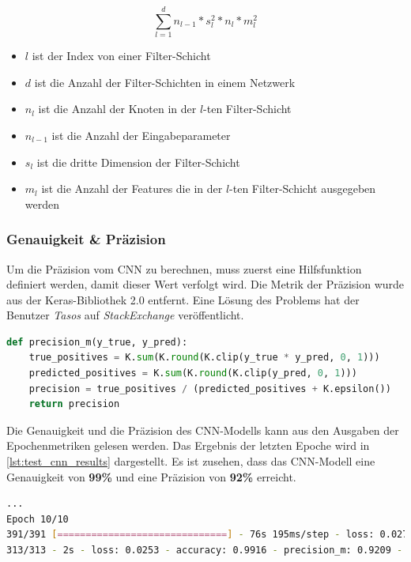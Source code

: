 \[\sum^{d}_{l=1}n_{l-1} * s^2_l * n_l * m^2_l \]

\begin{itemize}
    \item $l$ ist der Index von einer Filter-Schicht
    \item $d$ ist die Anzahl der Filter-Schichten in einem Netzwerk
    \item $n_l$ ist die Anzahl der Knoten in der $l$-ten Filter-Schicht
    \item $n_{l-1}$ ist die Anzahl der Eingabeparameter
    \item $s_l$ ist die dritte Dimension der Filter-Schicht
    \item $m_l$ ist die Anzahl der Features die in der $l$-ten Filter-Schicht ausgegeben werden
\end{itemize}
\cite{Kaiming_2014}

\subsubsection{Genauigkeit \& Präzision}

Um die Präzision vom CNN zu berechnen, muss zuerst eine Hilfsfunktion definiert werden, damit dieser Wert verfolgt wird. Die Metrik der Präzision wurde aus der Keras-Bibliothek 2.0 entfernt. Eine Lösung des Problems hat der Benutzer \textit{Tasos} auf \textit{StackExchange} veröffentlicht. \cite{stackexchange_2020}

\begin{minipage}{\textwidth}
    \begin{lstlisting}[language=Python, caption=Hilfsfunktion für Präzision \cite{stackexchange_2020}, label=lst:func_precision]
def precision_m(y_true, y_pred):
	true_positives = K.sum(K.round(K.clip(y_true * y_pred, 0, 1)))
	predicted_positives = K.sum(K.round(K.clip(y_pred, 0, 1)))
	precision = true_positives / (predicted_positives + K.epsilon())
	return precision	
	\end{lstlisting}
\end{minipage}


Die Genauigkeit und die Präzision des CNN-Modells kann aus den Ausgaben der Epochenmetriken gelesen werden. Das Ergebnis der letzten Epoche wird in \ref{lst:test_cnn_results} dargestellt. Es ist zusehen, dass das CNN-Modell eine Genauigkeit von \textbf{99\%} und eine Präzision von \textbf{92\%} erreicht.

\begin{minipage}{\textwidth}
    \begin{lstlisting}[language=Bash, caption=Testergebnisse vom CNN, label=lst:test_cnn_results]
...
Epoch 10/10
391/391 [==============================] - 76s 195ms/step - loss: 0.0273 - accuracy: 0.9909 - precision_m: 0.9264 - val_loss: 0.0374 - val_accuracy: 0.9891 - val_precision_m: 0.9191
313/313 - 2s - loss: 0.0253 - accuracy: 0.9916 - precision_m: 0.9209 - 2s/epoch - 5ms/step
	\end{lstlisting}
\end{minipage}

